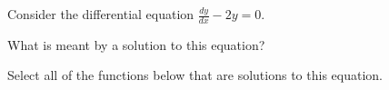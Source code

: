 \documentclass{ximera}
\author{Jim Talamo}
\begin{document}
\begin{exercise}
Consider the differential equation $\frac{dy}{dx} -2y =0$.

What is meant by a solution to this equation?

\begin{multipleChoice}
\end{multipleChoice}



Select all of the functions below that are solutions to this equation.

\begin{selectAll}
\end{selectAll}


\end{exercise}
\end{document}
